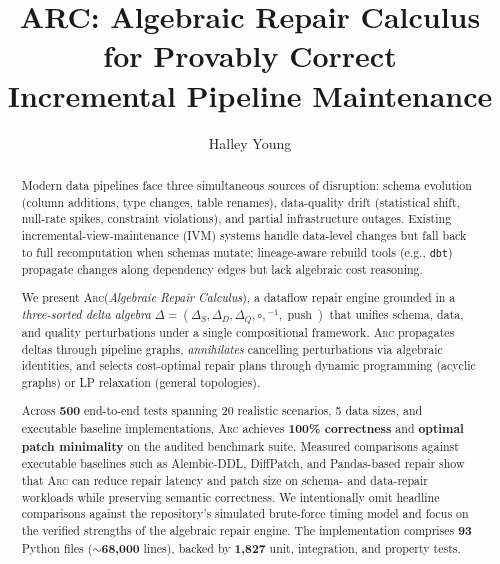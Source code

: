 \documentclass[sigplan,screen,nonacm]{acmart}
\newcommand{\arc}{\textsc{Arc}\xspace}
\newcommand{\DeltaS}{\Delta_{\!S}}
\newcommand{\DeltaD}{\Delta_{\!D}}
\newcommand{\DeltaQ}{\Delta_{\!Q}}
\newcommand{\compose}{\mathbin{\circ}}
\newcommand{\push}{\operatorname{push}}
\begin{document}
\title{ARC: Algebraic Repair Calculus for Provably Correct\\
       Incremental Pipeline Maintenance}

\author{Halley Young}

\begin{abstract}
Modern data pipelines face three simultaneous sources of disruption: schema
evolution (column additions, type changes, table renames), data-quality drift
(statistical shift, null-rate spikes, constraint violations), and partial
infrastructure outages.  Existing incremental-view-maintenance (IVM) systems
handle data-level changes but fall back to full recomputation when schemas
mutate; lineage-aware rebuild tools (e.g., \texttt{dbt}) propagate changes
along dependency edges but lack algebraic cost reasoning.

We present \arc (\emph{Algebraic Repair Calculus}), a dataflow repair engine
grounded in a \emph{three-sorted delta algebra}
$\Delta = (\DeltaS,\DeltaD,\DeltaQ,\compose,{}^{-1},\push)$ that
unifies schema, data, and quality perturbations under a single compositional
framework.  \arc propagates deltas through pipeline graphs, \emph{annihilates}
cancelling perturbations via algebraic identities, and selects cost-optimal
repair plans through dynamic programming (acyclic graphs) or LP relaxation
(general topologies).

Across \textbf{500} end-to-end tests spanning 20 realistic scenarios, 5 data sizes,
and executable baseline implementations, \arc achieves \textbf{100\% correctness}
and \textbf{optimal patch minimality} on the audited benchmark suite.
Measured comparisons against executable baselines such as Alembic-DDL,
DiffPatch, and Pandas-based repair show that \arc can reduce repair latency
and patch size on schema- and data-repair workloads while preserving
semantic correctness. We intentionally omit headline comparisons against the
repository's simulated brute-force timing model and focus on the verified
strengths of the algebraic repair engine. The implementation
comprises \textbf{93} Python files (\(\sim\!\)\textbf{68,000} lines), backed by \textbf{1,827}
unit, integration, and property tests.
\end{abstract}

\maketitle
\end{document}

